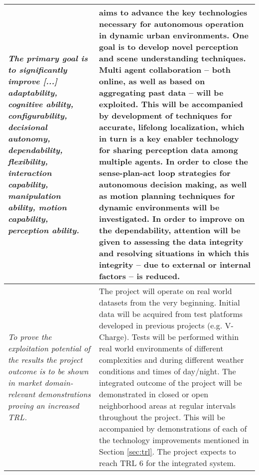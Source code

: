 \begin{center}
\begin{longtable}[h]{|m{6cm}|m{9.75cm}|}
      \textit{The primary goal is to significantly improve [...] adaptability, cognitive ability, configurability, decisional autonomy, dependability, flexibility, interaction capability, manipulation ability, motion capability, perception ability.} & \Project{} aims to advance the key technologies necessary for autonomous operation in dynamic urban environments. One goal is to develop novel perception and scene understanding techniques. Multi agent collaboration -- both online, as well as based on aggregating past data -- will be exploited. This will be accompanied by development of techniques for accurate, lifelong localization, which in turn is a key enabler technology for sharing perception data among multiple agents. In order to close the sense-plan-act loop strategies for autonomous decision making, as well as motion planning techniques for dynamic environments will be investigated. In order to improve on the dependability, attention will be given to assessing the data integrity and resolving situations in which this integrity -- due to external or internal factors -- is reduced. \\ \hline
  \textit{To prove the exploitation potential of the results the project outcome is to be shown in market domain-relevant demonstrations proving an increased TRL.} & The \Project{} project will operate on real world datasets from the very beginning. Initial data will be acquired from test platforms developed in previous projects (e.g. V-Charge). Tests will be performed within real world environments of different complexities and during different weather conditions and times of day/night. The integrated outcome of the project will be demonstrated in closed or open neighborhood areas at regular intervals throughout the project. This will be accompanied by demonstrations of each of the technology improvements mentioned in Section \ref{sec:trl}. The project expects to reach TRL 6 for the integrated system.\\ \hline
\end{longtable}
\end{center}

